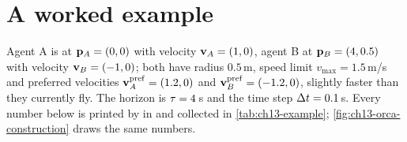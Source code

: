 \section{A worked example}
\label{sec:ch13-example}

\begin{example}
\label{ex:ch13-two-agents}
Agent A is at $\mathbf{p}_A = (0, 0)$ with velocity $\mathbf{v}_A = (1, 0)$, agent B at
$\mathbf{p}_B = (4, 0.5)$ with velocity $\mathbf{v}_B = (-1, 0)$; both have radius
$0.5$\,m, speed limit $v_{\max} = 1.5$\,m/s and preferred velocities
$\mathbf{v}_A^{\mathrm{pref}} = (1.2, 0)$ and $\mathbf{v}_B^{\mathrm{pref}} = (-1.2, 0)$,
slightly faster than they currently fly. The horizon is $\tau = 4$\,s and
the time step $\Delta t = 0.1$\,s. Every number below is printed by
 in  and collected in
\cref{tab:ch13-example}; \cref{fig:ch13-orca-construction} draws the same
numbers.
\end{example}

